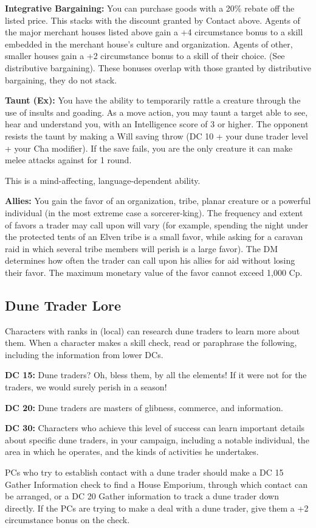 \textbf{Integrative Bargaining:} You can purchase goods with a 20\% rebate off the listed price. This stacks with the discount granted by Contact above. Agents of the major merchant houses listed above gain a +4 circumstance bonus to a skill embedded in the merchant house’s culture and organization. Agents of other, smaller houses gain a +2 circumstance bonus to a skill of their choice. (See distributive bargaining). These bonuses overlap with those granted by distributive bargaining, they do not stack.

\textbf{Taunt (Ex):} You have the ability to temporarily rattle a creature through the use of insults and goading. As a move action, you may taunt a target able to see, hear and understand you, with an Intelligence score of 3 or higher. The opponent resists the taunt by making a Will saving throw (DC 10 + your dune trader level + your Cha modifier). If the save fails, you are the only creature it can make melee attacks against for 1 round.

This is a mind-affecting, language-dependent ability.

\textbf{Allies:} You gain the favor of an organization, tribe, planar creature or a powerful individual (in the most extreme case a sorcerer-king). The frequency and extent of favors a trader may call upon will vary (for example, spending the night under the protected tents of an Elven tribe is a small favor, while asking for a caravan raid in which several tribe members will perish is a large favor). The DM determines how often the trader can call upon his allies for aid without losing their favor. The maximum monetary value of the favor cannot exceed 1,000 Cp.

\subsection{Dune Trader Lore}
Characters with ranks in  (local) can research dune traders to learn more about them. When a character makes a skill check, read or paraphrase the following, including the information from lower DCs.

\textbf{DC 15:} Dune traders? Oh, bless them, by all the elements! If it were not for the traders, we would surely perish in a season!

\textbf{DC 20:} Dune traders are masters of glibness, commerce, and information.

\textbf{DC 30:} Characters who achieve this level of success can learn important details about specific dune traders, in your campaign, including a notable individual, the area in which he operates, and the kinds of activities he undertakes.

PCs who try to establish contact with a dune trader should make a DC 15 Gather Information check to find a House Emporium, through which contact can be arranged, or a DC 20 Gather information to track a dune trader down directly. If the PCs are trying to make a deal with a dune trader, give them a +2 circumstance bonus on the check.